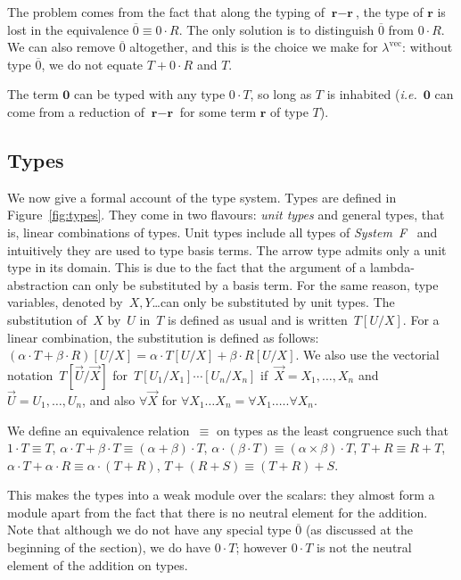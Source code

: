 \documentclass[colorlinks=true,linkcolor=black,urlcolor=black,citecolor=blue,submission,copyright,creativecommons]{eptcs}
\newcommand{\lvec}{\ensuremath{\lambda^{\!\!\textrm{vec}}}}
\newcommand{\ie}{\emph{i.e.}~}
\newcommand{\ve}[1]{\mathrm{\textbf{#1}}}
\begin{document}
The problem comes from the fact that along the typing of $\ve r - \ve
r$, the type of $\ve r$ is lost in the equivalence $\overline 0\equiv
0\cdot R$. The only solution is to distinguish $\overline 0$ from
$0\cdot R$. We can also remove $\overline 0$ altogether, and this is the
choice we make for \lvec: without type $\overline 0$, we do not equate
$T+0\cdot R$ and $T$.

The term $\ve 0$ can be typed with any
type $0\cdot T$, so long as $T$ is inhabited (\ie $\ve 0$ can come
from a reduction of $\ve r - \ve r$ for some term $\ve r$ of type
$T$).


\subsection{Types}

We now give a formal account of the type system. Types are defined in
Figure~\ref{fig:types}. They come in two flavours: {\em unit types}
and general types, that is, linear combinations of types.
Unit types include all types of
\emph{System~F}~\cite[Chapter~11]{GirardLafontTaylor89} and intuitively they are 
used to type basis terms.
The arrow type admits only a unit type in its domain. This is due to
the fact that the 
argument of a
lambda-abstraction can only be substituted by a basis term.
For the same reason, type variables, denoted by~$X, Y$\ldots can
only be substituted by unit types.
The substitution of~$X$ by~$U$ in~$T$ is defined as usual and is
written~$T[U/X]$. For a linear
combination, the substitution is defined as follows: $(\alpha\cdot T+\beta\cdot R)[U/X]=\alpha\cdot T[U/X]+\beta\cdot R[U/X]$.
We also use the vectorial notation~$T[\vec{U}/\vec{X}]$
for~$T[U_1/X_1]\cdots[U_n/X_n]$ if~$\vec{X}=X_1,\dots,X_n$
and~$\vec{U}=U_1,\dots,U_n$, and also $\forall \vec X$ for $\forall X_1\dots X_n=\forall X_1.\dots.\forall X_n$.

We define an equivalence relation~$\equiv$ on types as the least
congruence such that
 $1\cdot T\equiv T$,
$\alpha\cdot T+\beta\cdot T\equiv(\alpha+\beta)\cdot T$,
$\alpha\cdot (\beta\cdot T)\equiv (\alpha\times\beta)\cdot T$,
$T+R\equiv R+T$,
$\alpha\cdot T+\alpha\cdot R\equiv\alpha\cdot (T+R)$,
$T+(R+S)\equiv (T+R)+S$.

This makes the types into a weak module over the scalars: they almost
form a module apart from the fact that there is no neutral element for the
addition. Note that although we do not have any
special type $\overline 0$ (as discussed at the beginning of the section), we
do have $0\cdot T$; however $0\cdot T$ is not the neutral element of the addition
on types.
\end{document}
